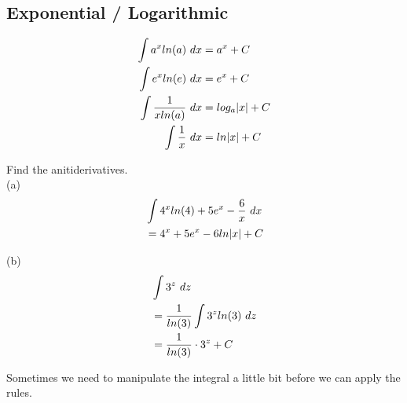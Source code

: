 \subsection{Exponential / Logarithmic}

\begin{theorem}
    \begin{align}
        \int a^xln(a) \ dx         & = a^x + C      \\
        \int e^xln(e) \ dx         & = e^x + C      \\
        \int {1 \over xln(a)} \ dx & = log_a|x| + C \\
        \int {1 \over x} \ dx      & = ln|x| + C
    \end{align}
\end{theorem}

\begin{exercise}\nonumber
    Find the anitiderivatives. \\

    (a)
    \begin{align}
         & \int 4^xln(4) + 5e^x - {6 \over x} \ dx \\
         & = 4^x + 5e^x - 6ln|x| + C               \\
    \end{align}

    (b)
    \begin{align}
         & \int 3^z \ dz                        \\
         & = {1 \over ln(3)} \int 3^zln(3) \ dz \\
         & = {1 \over ln(3)} \cdot 3^z + C
    \end{align}
\end{exercise}

Sometimes we need to manipulate the integral a little bit before we can apply the rules. \\


